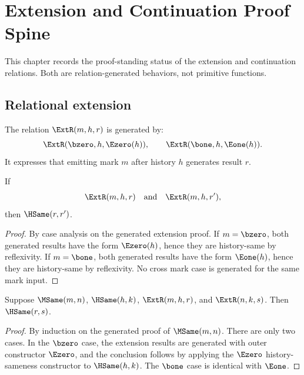 
\chapter{Extension and Continuation Proof Spine}
\label{ch:proof-standing-ext-cont-proof-spine}

This chapter records the proof-standing status of the extension and continuation relations. Both are relation-generated behaviors, not primitive functions.

\section{Relational extension}

\begin{definition}
The relation \(\ExtR(m,h,r)\) is generated by:
$$
\ExtR(\bzero,h,\Ezero(h)),
\qquad
\ExtR(\bone,h,\Eone(h)).
$$
It expresses that emitting mark \(m\) after history \(h\) generates result \(r\).
\end{definition}

\begin{theorem}
\label{thm:extension-determinacy-up-to-history-sameness}
If
$$
\ExtR(m,h,r)
\quad\text{and}\quad
\ExtR(m,h,r'),
$$
then \(\HSame(r,r')\).
\end{theorem}
\begin{proof}
By case analysis on the generated extension proof. If \(m=\bzero\), both generated results have the form \(\Ezero(h)\), hence they are history-same by reflexivity. If \(m=\bone\), both generated results have the form \(\Eone(h)\), hence they are history-same by reflexivity. No cross mark case is generated for the same mark input.
\end{proof}

\begin{theorem}
\label{thm:extension-respects-internal-sameness-spine}
Suppose \(\MSame(m,n)\), \(\HSame(h,k)\), \(\ExtR(m,h,r)\), and \(\ExtR(n,k,s)\). Then \(\HSame(r,s)\).
\end{theorem}
\begin{proof}
By induction on the generated proof of \(\MSame(m,n)\). There are only two cases. In the \(\bzero\) case, the extension results are generated with outer constructor \(\Ezero\), and the conclusion follows by applying the \(\Ezero\) history-sameness constructor to \(\HSame(h,k)\). The \(\bone\) case is identical with \(\Eone\).
\end{proof}

